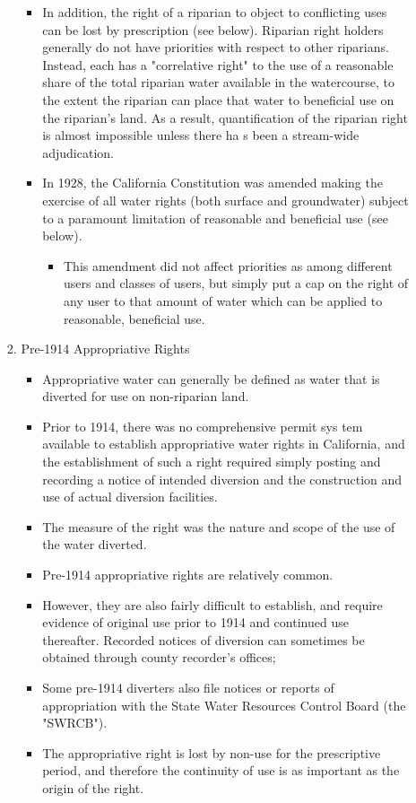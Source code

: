 \documentclass{article}
\begin{document}
\begin{enumerate}
\begin{itemize}
\begin{enumerate}
\begin{itemize}
\item In addition, the right of a riparian to object to conflicting uses can be lost by prescription (see below). Riparian right holders generally do not have priorities with respect to other riparians. Instead, each has a "correlative right" to the use of a reasonable share of the total riparian water available in the watercourse, to the extent the riparian can place that water to beneficial use on the riparian's land. As a result, quantification of the riparian right is almost impossible unless there ha s been a stream-wide adjudication.
\item In 1928, the California Constitution was amended making the exercise of all water rights (both surface and groundwater) subject to a paramount limitation of reasonable and beneficial use (see below). 
\begin{itemize}
\item This amendment did not affect priorities as among different users and classes of users, but simply put a cap on the right of any user to that amount of water which can be applied to reasonable, beneficial use. 
\end{itemize}
\end{itemize}
\item Pre-1914 Appropriative Rights
\begin{itemize}
\item Appropriative water can generally be defined as water that is diverted for use on non-riparian land. 
\item Prior to 1914, there was no comprehensive permit sys tem available to establish appropriative water rights in California, and the establishment of such a right required simply posting and recording a notice of intended diversion and the construction and use of actual diversion facilities.
\item The measure of the right was the nature and scope of the use of the water diverted. 
\item Pre-1914 appropriative rights are relatively common. 
\item However, they are also fairly difficult to establish, and require evidence of original use prior to 1914 and continued use thereafter. Recorded notices of diversion can sometimes be obtained through county recorder's offices; 
\item Some pre-1914 diverters also file notices or reports of appropriation with the State Water Resources Control Board (the "SWRCB"). 
\item The appropriative right is lost by non-use for the prescriptive period, and therefore the continuity of use is as important as the origin of the right. 

\end{itemize}
\end{enumerate}
\end{itemize}
\end{enumerate}
\end{document}
